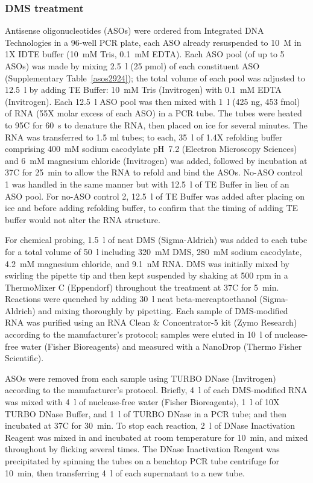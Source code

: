 \documentclass[main.tex]{subfiles}
\begin{document}
\subsubsection{DMS treatment}

Antisense oligonucleotides (ASOs) were ordered from Integrated DNA Technologies in a 96-well PCR plate, each ASO already resuspended to 10~\textmu M in 1X IDTE buffer (10~mM Tris, 0.1~mM EDTA).
Each ASO pool (of up to 5 ASOs) was made by mixing 2.5~\textmu l (25 pmol) of each constituent ASO (Supplementary Table~\ref{asos2924}); the total volume of each pool was adjusted to 12.5~\textmu l by adding TE Buffer: 10~mM Tris (Invitrogen) with 0.1~mM EDTA (Invitrogen).
Each 12.5~\textmu l ASO pool was then mixed with 1~\textmu l (425 ng, 453 fmol) of RNA (55X molar excess of each ASO) in a PCR tube.
The tubes were heated to 95\textdegree C for 60~s to denature the RNA, then placed on ice for several minutes.
The RNA was transferred to 1.5 ml tubes; to each, 35~\textmu l of 1.4X refolding buffer comprising 400~mM sodium cacodylate pH~7.2 (Electron Microscopy Sciences) and 6~mM magnesium chloride (Invitrogen) was added, followed by incubation at 37\textdegree C for 25~min to allow the RNA to refold and bind the ASOs.
No-ASO control 1 was handled in the same manner but with 12.5~\textmu l of TE Buffer in lieu of an ASO pool.
For no-ASO control 2, 12.5~\textmu l of TE Buffer was added after placing on ice and before adding refolding buffer, to confirm that the timing of adding TE buffer would not alter the RNA structure.

For chemical probing, 1.5~\textmu l of neat DMS (Sigma-Aldrich) was added to each tube for a total volume of 50~\textmu l including 320~mM DMS, 280~mM sodium cacodylate, 4.2~mM magnesium chloride, and 9.1~nM RNA.
DMS was initially mixed by swirling the pipette tip and then kept suspended by shaking at 500 rpm in a ThermoMixer C (Eppendorf) throughout the treatment at 37\textdegree C for 5~min.
Reactions were quenched by adding 30~\textmu l neat beta-mercaptoethanol (Sigma-Aldrich) and mixing thoroughly by pipetting.
Each sample of DMS-modified RNA was purified using an RNA Clean \& Concentrator-5 kit (Zymo Research) according to the manufacturer's protocol; samples were eluted in 10~\textmu l of nuclease-free water (Fisher Bioreagents) and measured with a NanoDrop (Thermo Fisher Scientific).

ASOs were removed from each sample using TURBO DNase (Invitrogen) according to the manufacturer's protocol.
Briefly, 4~\textmu l of each DMS-modified RNA was mixed with 4~\textmu l of nuclease-free water (Fisher Bioreagents), 1~\textmu l of 10X TURBO DNase Buffer, and 1~\textmu l of TURBO DNase in a PCR tube; and then incubated at 37\textdegree C for 30~min.
To stop each reaction, 2~\textmu l of DNase Inactivation Reagent was mixed in and incubated at room temperature for 10~min, and mixed throughout by flicking several times.
The DNase Inactivation Reagent was precipitated by spinning the tubes on a benchtop PCR tube centrifuge for 10~min, then transferring 4~\textmu l of each supernatant to a new tube.
\end{document}
